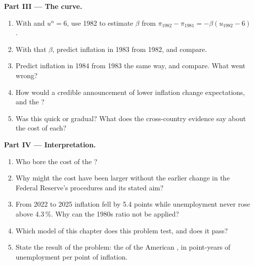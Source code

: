 \begin{problem}
\medskip
\noindent\textbf{Part III --- The curve.}
\begin{enumerate}[resume]
\item With  and $u^n = 6$, use 1982 to estimate $\beta$ from $\pi_{1982} - \pi_{1981} = -\beta(u_{1982} - 6)$.
\item With that $\beta$, predict inflation in 1983 from 1982, and compare.
\item Predict inflation in 1984 from 1983 the same way, and compare. What went wrong?
\item How would a credible announcement of lower inflation change expectations, and the ?
\item Was this  quick or gradual? What does the cross-country evidence say about the cost of each?
\end{enumerate}

\medskip
\noindent\textbf{Part IV --- Interpretation.}
\begin{enumerate}[resume]
\item Who bore the cost of the ?
\item Why might the cost have been larger without the earlier change in the Federal Reserve's procedures and its stated aim?
\item From 2022 to 2025 inflation fell by 5.4 points while unemployment never rose above 4.3\,\%. Why can the 1980s ratio not be applied?
\item Which model of this chapter does this problem test, and does it pass?
\item State the result of the problem: the  of the American , in point-years of unemployment per point of inflation.
\end{enumerate}
\end{problem}

